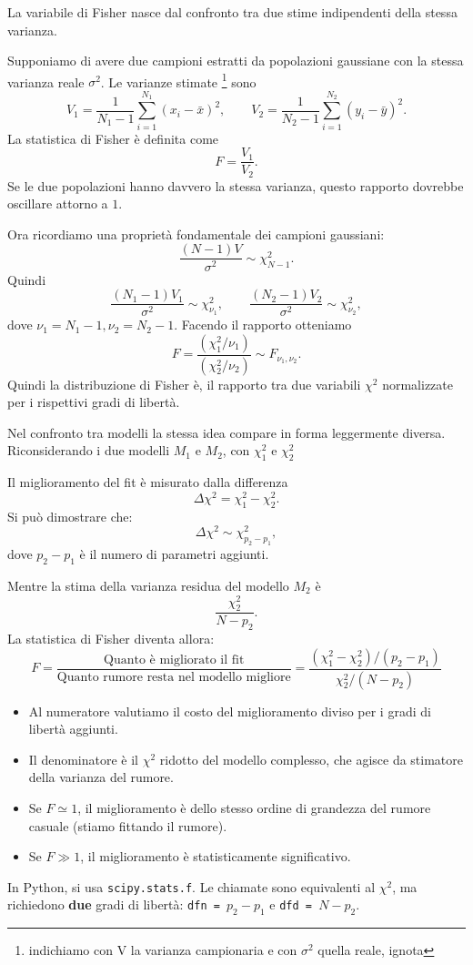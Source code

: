 \documentclass[openany,a4paper,12pt]{book}
\theoremstyle{remark}
\begin{document}
La variabile di Fisher nasce dal confronto tra due stime indipendenti della stessa varianza.

Supponiamo di avere due campioni estratti da popolazioni gaussiane con la stessa varianza reale \(\sigma^2\). Le varianze stimate \footnote{indichiamo con V la varianza campionaria e con $\sigma^2$ quella reale, ignota} sono
\[ 
V_1 = \frac{1}{N_1-1} \sum_{i=1}^{N_1}(x_i-\bar x)^2, \qquad V_2 =\frac{1}{N_2-1}\sum_{i=1}^{N_2}(y_i-\bar y)^2.
\]
La statistica di Fisher è definita come
\[
F=\frac{V_1}{V_2}.
\]
Se le due popolazioni hanno davvero la stessa varianza, questo rapporto dovrebbe oscillare attorno a \(1\).

Ora ricordiamo una proprietà fondamentale dei campioni gaussiani:
\[
\frac{(N-1)V}{\sigma^2} \sim \chi^2_{N-1}.
\]
Quindi
\[
\frac{(N_1-1)V_1}{\sigma^2} \sim \chi^2_{\nu_1},
\qquad
\frac{(N_2-1)V_2}{\sigma^2} \sim \chi^2_{\nu_2},
\]
dove $\nu_1=N_1-1,  \nu_2=N_2-1.$
Facendo il rapporto otteniamo
\[
F =\frac{ \left(\chi_1^2/\nu_1\right)}{\left(\chi_2^2/\nu_2\right)}\sim F_{\nu_1,\nu_2}.
\]
Quindi la distribuzione di Fisher è, il rapporto tra due variabili \(\chi^2\) normalizzate per i rispettivi gradi di libertà.

Nel confronto tra modelli la stessa idea compare in forma leggermente diversa.
Riconsiderando i due modelli $M_1$ e $M_2$, con $\chi_1^2$ e $\chi_2^2$

Il miglioramento del fit è misurato dalla differenza
\[
\Delta\chi^2 = \chi_1^2-\chi_2^2.
\]
Si può dimostrare che:
\[
\Delta\chi^2 \sim \chi^2_{p_2-p_1},
\]
dove \(p_2-p_1\) è il numero di parametri aggiunti.

Mentre la stima della varianza residua del modello $M_2$ è
\[
\frac{\chi_2^2}{N-p_2}.
\]
La statistica di Fisher diventa allora:
\begin{equation}
    F = \frac{\text{Quanto è migliorato il fit}}{\text{Quanto rumore resta nel modello migliore}} = \frac{(\chi^2_1 - \chi^2_2) / (p_2 - p_1)}{\chi^2_2 / (N - p_2)}
\end{equation}
\begin{itemize}
    \item Al numeratore valutiamo il costo del miglioramento diviso per i gradi di libertà aggiunti.
    \item Il denominatore è il $\chi^2$ ridotto del modello complesso, che agisce da stimatore della varianza del rumore.
\end{itemize}

\begin{itemize}
    \item Se $F \simeq 1$, il miglioramento è dello stesso ordine di grandezza del rumore casuale (stiamo fittando il rumore).
    \item Se $F \gg 1$, il miglioramento è statisticamente significativo.
\end{itemize}
In Python, si usa \texttt{scipy.stats.f}. Le chiamate sono equivalenti al $\chi^2$, ma richiedono \textbf{due} gradi di libertà: \texttt{dfn = $p_2 - p_1$} e \texttt{dfd = $N - p_2$}.
\end{document}
